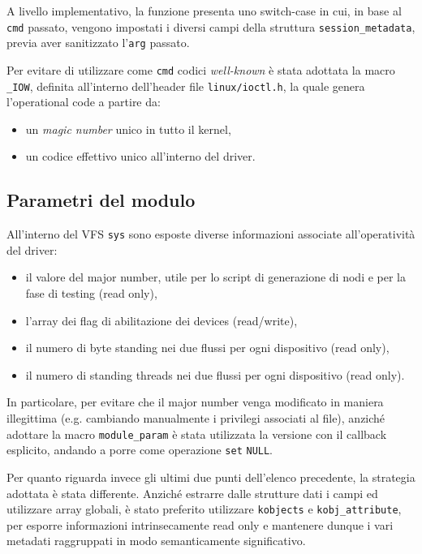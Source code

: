 \documentclass{article}
\begin{document}
A livello implementativo, la funzione presenta uno switch-case in cui, in base al \texttt{cmd} passato, vengono impostati i diversi campi della struttura \texttt{session\_metadata}, previa aver sanitizzato l'\texttt{arg} passato.

Per evitare di utilizzare come \texttt{cmd} codici \textit{well-known} è stata adottata la macro \texttt{\_IOW}, definita all'interno dell'header file \texttt{linux/ioctl.h}, la quale genera l'operational code a partire da:
\begin{itemize}
        \item un \textit{magic number} unico in tutto il kernel,
        \item un codice effettivo unico all'interno del driver.
\end{itemize}

\subsection{Parametri del modulo}
All'interno del VFS \texttt{sys} sono esposte diverse informazioni associate all'operatività del driver:
\begin{itemize}
        \item il valore del major number, utile per lo script di generazione di nodi e per la fase di testing (read only),
        \item l'array dei flag di abilitazione dei devices (read/write),
        \item il numero di byte standing nei due flussi per ogni dispositivo (read only),
        \item il numero di standing threads nei due flussi per ogni dispositivo (read only).
\end{itemize}

In particolare, per evitare che il major number venga modificato in maniera illegittima (e.g. cambiando manualmente i privilegi associati al file), anziché adottare la macro \texttt{module\_param} è stata utilizzata la versione con il callback esplicito, andando a porre come operazione \texttt{set} \texttt{NULL}.

Per quanto riguarda invece gli ultimi due punti dell'elenco precedente, la strategia adottata è stata differente. Anziché estrarre dalle strutture dati i campi ed utilizzare array globali, è stato preferito utilizzare \texttt{kobjects} e \texttt{kobj\_attribute}, per esporre informazioni intrinsecamente read only e mantenere dunque i vari metadati raggruppati in modo semanticamente significativo.
\end{document}
